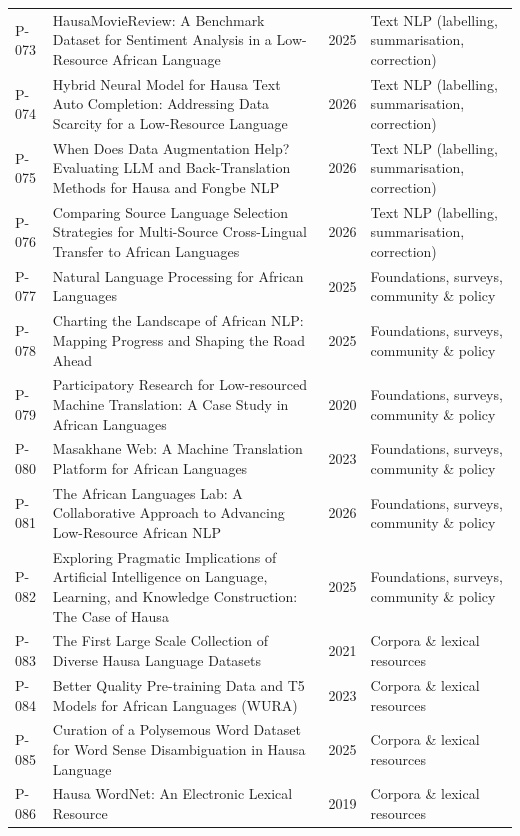 \begin{longtable}{@{}p{} p{} p{} p{}@{}}
P-073 & HausaMovieReview: A Benchmark Dataset for Sentiment Analysis in a Low-Resource African Language & 2025 & Text NLP (labelling, summarisation, correction) \\
P-074 & Hybrid Neural Model for Hausa Text Auto Completion: Addressing Data Scarcity for a Low-Resource Language & 2026 & Text NLP (labelling, summarisation, correction) \\
P-075 & When Does Data Augmentation Help? Evaluating LLM and Back-Translation Methods for Hausa and Fongbe NLP & 2026 & Text NLP (labelling, summarisation, correction) \\
P-076 & Comparing Source Language Selection Strategies for Multi-Source Cross-Lingual Transfer to African Languages & 2026 & Text NLP (labelling, summarisation, correction) \\
P-077 & Natural Language Processing for African Languages & 2025 & Foundations, surveys, community \& policy \\
P-078 & Charting the Landscape of African NLP: Mapping Progress and Shaping the Road Ahead & 2025 & Foundations, surveys, community \& policy \\
P-079 & Participatory Research for Low-resourced Machine Translation: A Case Study in African Languages & 2020 & Foundations, surveys, community \& policy \\
P-080 & Masakhane Web: A Machine Translation Platform for African Languages & 2023 & Foundations, surveys, community \& policy \\
P-081 & The African Languages Lab: A Collaborative Approach to Advancing Low-Resource African NLP & 2026 & Foundations, surveys, community \& policy \\
P-082 & Exploring Pragmatic Implications of Artificial Intelligence on Language, Learning, and Knowledge Construction: The Case of Hausa & 2025 & Foundations, surveys, community \& policy \\
P-083 & The First Large Scale Collection of Diverse Hausa Language Datasets & 2021 & Corpora \& lexical resources \\
P-084 & Better Quality Pre-training Data and T5 Models for African Languages (WURA) & 2023 & Corpora \& lexical resources \\
P-085 & Curation of a Polysemous Word Dataset for Word Sense Disambiguation in Hausa Language & 2025 & Corpora \& lexical resources \\
P-086 & Hausa WordNet: An Electronic Lexical Resource & 2019 & Corpora \& lexical resources \\

\end{longtable}
